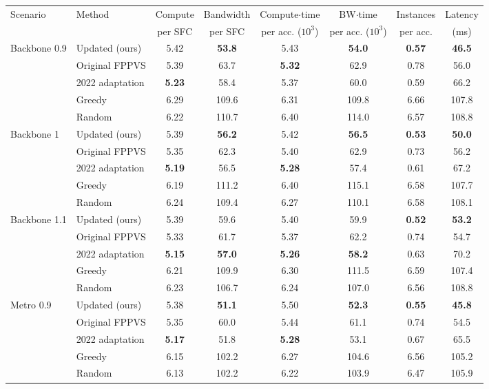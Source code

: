 \begin{tabular}{llcccccc}
\toprule
Scenario & Method & Compute & Bandwidth & Compute$\cdot$time & BW$\cdot$time & Instances & Latency \\
 & & per SFC & per SFC & per acc. ($10^3$) & per acc. ($10^3$) & per acc. & (ms) \\
\midrule
Backbone 0.9 & Updated (ours) & 5.42 & \textbf{53.8} & 5.43 & \textbf{54.0} & \textbf{0.57} & \textbf{46.5} \\
 & Original FPPVS & 5.39 & 63.7 & \textbf{5.32} & 62.9 & 0.78 & 56.0 \\
 & 2022 adaptation & \textbf{5.23} & 58.4 & 5.37 & 60.0 & 0.59 & 66.2 \\
 & Greedy & 6.29 & 109.6 & 6.31 & 109.8 & 6.66 & 107.8 \\
 & Random & 6.22 & 110.7 & 6.40 & 114.0 & 6.57 & 108.8 \\
\midrule
Backbone 1 & Updated (ours) & 5.39 & \textbf{56.2} & 5.42 & \textbf{56.5} & \textbf{0.53} & \textbf{50.0} \\
 & Original FPPVS & 5.35 & 62.3 & 5.40 & 62.9 & 0.73 & 56.2 \\
 & 2022 adaptation & \textbf{5.19} & 56.5 & \textbf{5.28} & 57.4 & 0.61 & 67.2 \\
 & Greedy & 6.19 & 111.2 & 6.40 & 115.1 & 6.58 & 107.7 \\
 & Random & 6.24 & 109.4 & 6.27 & 110.1 & 6.58 & 108.1 \\
\midrule
Backbone 1.1 & Updated (ours) & 5.39 & 59.6 & 5.40 & 59.9 & \textbf{0.52} & \textbf{53.2} \\
 & Original FPPVS & 5.33 & 61.7 & 5.37 & 62.2 & 0.74 & 54.7 \\
 & 2022 adaptation & \textbf{5.15} & \textbf{57.0} & \textbf{5.26} & \textbf{58.2} & 0.63 & 70.2 \\
 & Greedy & 6.21 & 109.9 & 6.30 & 111.5 & 6.59 & 107.4 \\
 & Random & 6.23 & 106.7 & 6.24 & 107.0 & 6.56 & 108.8 \\
\midrule
Metro 0.9 & Updated (ours) & 5.38 & \textbf{51.1} & 5.50 & \textbf{52.3} & \textbf{0.55} & \textbf{45.8} \\
 & Original FPPVS & 5.35 & 60.0 & 5.44 & 61.1 & 0.74 & 54.5 \\
 & 2022 adaptation & \textbf{5.17} & 51.8 & \textbf{5.28} & 53.1 & 0.67 & 65.5 \\
 & Greedy & 6.15 & 102.2 & 6.27 & 104.6 & 6.56 & 105.2 \\
 & Random & 6.13 & 102.2 & 6.22 & 103.9 & 6.47 & 105.9 \\

\end{tabular}

